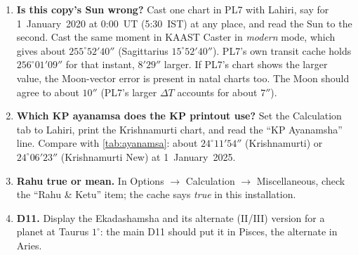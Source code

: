 \begin{enumerate}[leftmargin=*]
  \item \textbf{Is this copy's Sun wrong?} Cast one chart in PL7 with Lahiri, say for
  1~January~2020 at 0:00~UT (5:30~IST) at any place, and read the Sun to the second.
  Cast the same moment in KAAST Caster in \emph{modern} mode, which gives about
  $255^\circ 52' 40''$ (Sagittarius $15^\circ 52' 40''$). PL7's own transit cache holds
  $256^\circ 01' 09''$ for that instant, $8'29''$ larger. If PL7's chart shows the larger value,
  the Moon-vector error is present in natal charts too. The Moon should agree to about $10''$
  (PL7's larger $\Delta T$ accounts for about $7''$).
  \item \textbf{Which KP ayanamsa does the KP printout use?} Set the Calculation tab to
  Lahiri, print the Krishnamurti chart, and read the ``KP Ayanamsha'' line. Compare with
  \autoref{tab:ayanamsa}: about $24^\circ 11' 54''$ (Krishnamurti) or $24^\circ 06' 23''$
  (Krishnamurti New) at 1~January~2025.
  \item \textbf{Rahu true or mean.} In Options $\to$ Calculation $\to$ Miscellaneous, check
  the ``Rahu \& Ketu'' item; the cache says \emph{true} in this installation.
  \item \textbf{D11.} Display the Ekadashamsha and its alternate (II/III) version for a
  planet at Taurus $1^\circ$: the main D11 should put it in Pisces, the alternate in Aries.
\end{enumerate}
